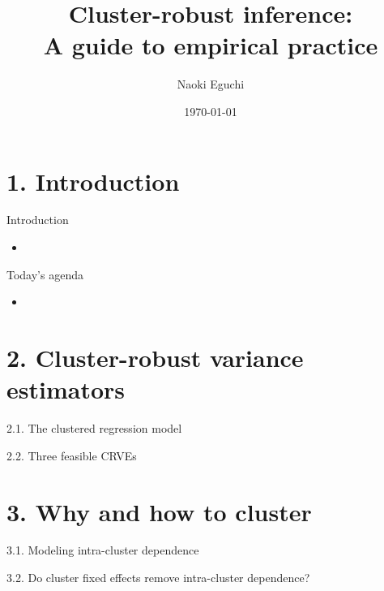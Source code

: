 \documentclass[xcolor=svgnames,aspectratio=169]{beamer}
\begin{document}
 

\title{Cluster-robust inference:\\ \small{A guide to empirical practice}}
\author{Naoki Eguchi}          
\date{\today}

\begin{frame}                  
    \titlepage                     
\end{frame}

\section{1. Introduction}

\begin{frame}{Introduction}
    \begin{itemize}
        \item 
    \end{itemize}
\end{frame}

\begin{frame}{Today's agenda}
    \begin{itemize}
        \item 
    \end{itemize}
\end{frame}

\section{2. Cluster-robust variance estimators}

\begin{frame}{2.1. The clustered regression model}
\end{frame}

\begin{frame}{2.2. Three feasible CRVEs}
\end{frame}

\section{3. Why and how to cluster}

\begin{frame}{3.1. Modeling intra-cluster dependence}
\end{frame}

\begin{frame}{3.2. Do cluster fixed effects remove intra-cluster dependence?}
\end{frame}
\end{document}
